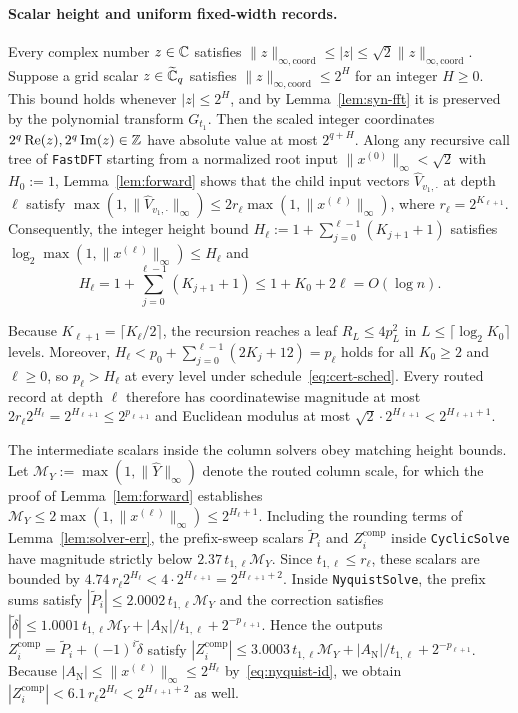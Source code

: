 \paragraph{Scalar height and uniform fixed-width records.}
Every complex number $z \in \mathbb{C}$ satisfies $\|z\|_{\infty,\mathrm{coord}} \le |z| \le \sqrt{2}\|z\|_{\infty,\mathrm{coord}}$. Suppose a grid scalar $z \in \widetilde{\mathbb{C}}_q$ satisfies $\|z\|_{\infty,\mathrm{coord}} \le 2^H$ for an integer $H \ge 0$. This bound holds whenever $|z| \le 2^H$, and by Lemma~\ref{lem:syn-fft} it is preserved by the polynomial transform $G_{t_1}$. Then the scaled integer coordinates $2^q \operatorname{Re}(z), 2^q \operatorname{Im}(z) \in \mathbb{Z}$ have absolute value at most $2^{q+H}$. Along any recursive call tree of \texttt{FastDFT} starting from a normalized root input $\|x^{(0)}\|_\infty < \sqrt{2}$ with $H_0 := 1$, Lemma~\ref{lem:forward} shows that the child input vectors $\widehat{V}_{v_1, \cdot}$ at depth $\ell$ satisfy $\max(1, \|\widehat{V}_{v_1, \cdot}\|_\infty) \le 2 r_\ell \max(1, \|x^{(\ell)}\|_\infty)$, where $r_\ell = 2^{K_{\ell+1}}$. Consequently, the integer height bound $H_\ell := 1 + \sum_{j=0}^{\ell-1} (K_{j+1} + 1)$ satisfies $\log_2 \max(1, \|x^{(\ell)}\|_\infty) \le H_\ell$ and
\begin{equation}\label{eq:height-bound}
  H_\ell = 1 + \sum_{j=0}^{\ell-1} (K_{j+1} + 1) \le 1 + K_0 + 2\ell = O(\log n).
\end{equation}

Because $K_{\ell+1} = \lceil K_\ell / 2 \rceil$, the recursion reaches a leaf $R_L \le 4 p_L^2$ in $L \le \lceil \log_2 K_0 \rceil$ levels. Moreover, $H_\ell < p_0 + \sum_{j=0}^{\ell-1} (2 K_j + 12) = p_\ell$ holds for all $K_0 \ge 2$ and $\ell \ge 0$, so $p_\ell > H_\ell$ at every level under schedule~\eqref{eq:cert-sched}. Every routed record at depth $\ell$ therefore has coordinatewise magnitude at most $2 r_\ell 2^{H_\ell} = 2^{H_{\ell+1}} \le 2^{p_{\ell+1}}$ and Euclidean modulus at most $\sqrt{2}\cdot 2^{H_{\ell+1}} < 2^{H_{\ell+1}+1}$.

The intermediate scalars inside the column solvers obey matching height bounds. Let $\mathcal{M}_Y := \max(1, \|\widehat{Y}\|_\infty)$ denote the routed column scale, for which the proof of Lemma~\ref{lem:forward} establishes $\mathcal{M}_Y \le 2\max(1, \|x^{(\ell)}\|_\infty) \le 2^{H_\ell+1}$. Including the rounding terms of Lemma~\ref{lem:solver-err}, the prefix-sweep scalars $\tilde{P}_i$ and $Z^{\mathrm{comp}}_i$ inside \texttt{CyclicSolve} have magnitude strictly below $2.37\,t_{1,\ell}\mathcal{M}_Y$. Since $t_{1,\ell} \le r_\ell$, these scalars are bounded by $4.74\, r_\ell 2^{H_\ell} < 4 \cdot 2^{H_{\ell+1}} = 2^{H_{\ell+1}+2}$. Inside \texttt{NyquistSolve}, the prefix sums satisfy $|\tilde{P}_i| \le 2.0002\,t_{1,\ell}\mathcal{M}_Y$ and the correction satisfies $|\tilde{\delta}| \le 1.0001\,t_{1,\ell}\mathcal{M}_Y + |A_{\mathrm{N}}|/t_{1,\ell} + 2^{-p_{\ell+1}}$. Hence the outputs $Z^{\mathrm{comp}}_i = \tilde{P}_i + (-1)^i\tilde{\delta}$ satisfy $|Z^{\mathrm{comp}}_i| \le 3.0003\,t_{1,\ell}\mathcal{M}_Y + |A_{\mathrm{N}}|/t_{1,\ell} + 2^{-p_{\ell+1}}$. Because $|A_{\mathrm{N}}| \le \|x^{(\ell)}\|_\infty \le 2^{H_\ell}$ by~\eqref{eq:nyquist-id}, we obtain $|Z^{\mathrm{comp}}_i| < 6.1\, r_\ell 2^{H_\ell} < 2^{H_{\ell+1}+2}$ as well.

